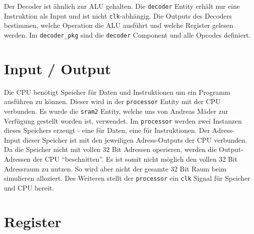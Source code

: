 \documentclass[paper=a4,fontsize=11pt,twocolumn]{scrreprt}
\begin{document}
Der Decoder ist ähnlich zur ALU gehalten.
Die \texttt{decoder} Entity erhält nur eine Instruktion als Input und ist nicht \texttt{clk}-abhängig.
Die Outputs des Decoders bestimmen, welche Operation die ALU ausführt und welche Register gelesen werden.
Im \texttt{decoder\_pkg} sind die \texttt{decoder} Component und alle Opcodes definiert.

\section{Input / Output}
\label{sec:input_output}

Die CPU benötigt Speicher für Daten und Instruktionen um ein Programm ausführen zu können.
Dieser wird in der \texttt{processor} Entity mit der CPU verbunden.
Es wurde die \texttt{sram2} Entity, welche uns von Andreas Mäder zur Verfügung gestellt worden ist, verwendet.
Im \texttt{processor} werden zwei Instanzen dieses Speichers erzeugt - eine für Daten, eine für Instruktionen.
Der Adress-Input dieser Speicher ist mit den jeweiligen Adress-Outputs der CPU verbunden.
Da die Speicher nicht mit vollen 32 Bit Adressen operieren, werden die Output-Adressen der CPU \enquote{beschnitten}.
Es ist somit nicht möglich den vollen 32 Bit Adressraum zu nutzen.
So wird aber nicht der gesamte 32 Bit Raum beim simulieren alloziert.
Des Weiteren stellt der \texttt{processor} ein \texttt{clk} Signal für Speicher und CPU bereit.

\section{Register}
\label{sec:register}
\end{document}
